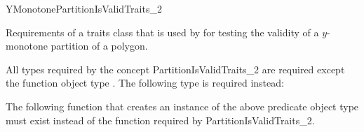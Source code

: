 
\renewcommand\ccRefPageBegin{\ccParDims\cgalColumnLayout\begin{ccAdvanced}}
\renewcommand\ccRefPageEnd{\ccParDims\cgalColumnLayout\end{ccAdvanced}}
\begin{ccRefConcept}{YMonotonePartitionIsValidTraits_2}


\ccDefinition
  
Requirements of a traits class that is used 
by  for testing the validity of a
$y$-monotone partition of a polygon.

\ccTypes

All types required by the concept PartitionIsValidTraits\_2 are required
except the function object type . The following type is
required instead:


\ccOperations

The following function that creates an instance of the above predicate object
type must exist instead of the function  required by
PartitionIsValidTraits\_2.


\ccHasModels


\ccSeeAlso

 \\

\end{ccRefConcept}
\renewcommand\ccRefPageBegin{\ccParDims\cgalColumnLayout}
\renewcommand\ccRefPageEnd{\ccParDims\cgalColumnLayout}


